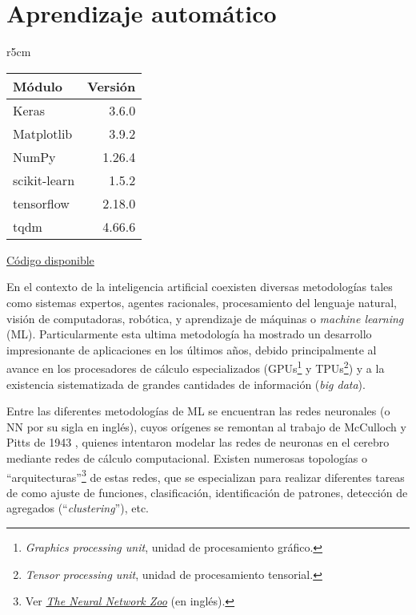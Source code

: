 

 \chapter{Aprendizaje automático} \label{ch:machine}   
\begin{wraptable}{r}{5cm}
\begin{modulesinfo}
\begin{center}
{\small
    \begin{tabular}{l r}
        \toprule
        \textbf{Módulo} & \textbf{Versión} \\
        \midrule
        Keras & 3.6.0 \\
        Matplotlib & 3.9.2 \\
        NumPy & 1.26.4 \\
        scikit-learn & 1.5.2 \\
        tensorflow & 2.18.0 \\
        tqdm & 4.66.6 \\
        \bottomrule
    \end{tabular}
    \vspace{0.75em}
    
    \href{https://github.com/facundobatista/libro-pyciencia/tree/master/código/machine_learning/}{Código disponible}
}
\end{center}
\end{modulesinfo}
\end{wraptable}

En el contexto de la inteligencia artificial coexisten diversas metodologías tales como sistemas expertos, agentes racionales, procesamiento del lenguaje natural, visión de computadoras, robótica, y aprendizaje de máquinas o \textit{machine learning} (ML). Particularmente esta ultima metodología ha mostrado un desarrollo impresionante de aplicaciones en los últimos años, debido principalmente al avance en los procesadores de cálculo especializados (GPUs\footnote{\textit{Graphics processing unit}, unidad de procesamiento gráfico.} y TPUs\footnote{\textit{Tensor processing unit}, unidad de procesamiento tensorial.}) y a la existencia sistematizada de grandes cantidades de información (\textit{big data}).

 Entre las diferentes metodologías de ML se encuentran las redes neuronales (o NN por su sigla en inglés), cuyos orígenes se remontan al trabajo de McCulloch y Pitts de 1943 \cite{McCulloch1943}, quienes intentaron modelar las redes de neuronas en el cerebro mediante redes de cálculo computacional. Existen numerosas topologías o ``arquitecturas''\footnote{Ver \href{https://www.asimovinstitute.org/neural-network-zoo/}{\textit{The Neural Network Zoo}} (en inglés).} de estas redes, que se especializan para realizar diferentes tareas de como ajuste de funciones, clasificación, identificación de patrones, detección de agregados (``\textit{clustering}''), etc.

